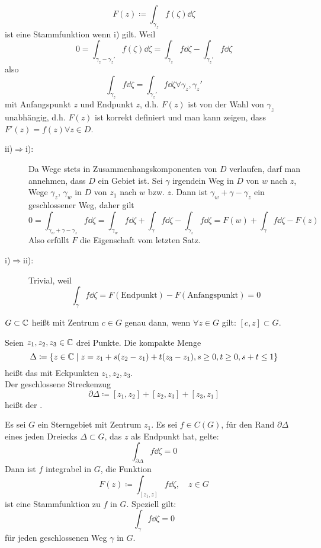 \begin{bemerkung*}
	\[ F(z)\coloneqq\int_{\gamma_z}^{} f(\zeta)\dd\zeta \]
	ist eine Stammfunktion wenn i) gilt. Weil
	\[ 0=\int_{\gamma_z-\gamma_z'}^{}f(\zeta)\dd\zeta=\int_{\gamma_z}^{} f\dd\zeta-\int_{\gamma_z'}^{} f\dd\zeta  \]
	also
	\[ \int_{\gamma_z}^{}f\dd\zeta=\int_{\gamma_z'}^{}f\dd\zeta\forall\gamma_z,\gamma_z' \] mit Anfangspunkt $ z $ und Endpunkt $ z $, d.h. $ F(z) $ ist von der Wahl von $ \gamma_z $ unabh\"angig, d.h. $ F(z) $ ist korrekt definiert und man kann zeigen, dass $ F'(z)=f(z)\forall z\in D $.
\end{bemerkung*}
\newpage
\begin{beweis}
	\begin{description}
	\item[ii)$ \Rightarrow $i):] Da Wege stets in Zusammenhangskomponenten von $ D $ verlaufen, darf man annehmen, dass $ D $ ein Gebiet ist. Sei $ \gamma $ irgendein Weg in $ D $ von $ w $ nach $ z $, Wege $ \gamma_z $, $ \gamma_w $ in $ D $ von $ z_1 $ nach $ w $ bzw. $ z $. Dann ist $ \gamma_w+\gamma-\gamma_z $ ein geschlossener Weg, daher gilt
	\[ 0=\int_{\gamma_w+\gamma-\gamma_z}^{} f\dd\zeta=\int_{\gamma_w}^{} f\dd\zeta+\int_{\gamma}^{} f\dd\zeta-\int_{\gamma_z}^{} f\dd\zeta=F(w)+\int_{\gamma}^{} f\dd\zeta-F(z) \]
	Also erf\"ullt $ F $ die Eigenschaft vom letzten Satz.
	\item[i)$ \Rightarrow $ii):] Trivial, weil
	\[ \int_{\gamma}^{} f\dd\zeta=F(\text{Endpunkt})-F(\text{Anfangspunkt})=0 \]
	\end{description}
\end{beweis}
\begin{definition}
	$ G \subset \mathbb{C} $ hei\ss t  mit Zentrum $ c\in G $ genau dann, wenn $ \forall z\in G $ gilt: $ [c,z]\subset G $.
\end{definition}
\begin{definition}
	Seien $ z_1,z_2,z_3\in\mathbb{C} $ drei Punkte. Die kompakte Menge \[ \Delta\coloneqq\lbrace z\in\mathbb{C}\mid z=z_1+s(z_2-z_1)+t(z_3-z_1),s\geq 0,t\geq 0, s+t\leq 1\rbrace \]
	hei\ss t das  mit Eckpunkten $ z_1,z_2,z_3 $.\\
	Der geschlossene Streckenzug
	\[ \partial\Delta\coloneqq[z_1,z_2]+[z_2,z_3]+[z_3,z_1] \]
	hei\ss t der . 
\end{definition}
\newpage
\begin{satz}
	Es sei $ G $ ein Sterngebiet mit Zentrum $ z_1 $. Es sei $ f\in C(G) $, f\"ur den Rand $ \partial\Delta $ eines jeden Dreiecks $ \Delta\subset G $, das $ z $ als Endpunkt hat, gelte:
	\[ \int_{\partial\Delta}^{} f\dd\zeta = 0 \]
	Dann ist $ f $ integrabel in $ G $, die Funktion
	\[ F(z)\coloneqq\int_{[z_1,z]}^{} f\dd\zeta,\quad z\in G \]
	ist eine Stammfunktion zu $ f $ in $ G $. Speziell gilt:
	\[ \int_{\gamma}^{} f\dd\zeta=0 \]
	f\"ur jeden geschlossenen Weg $ \gamma $ in $ G $.
\end{satz}
